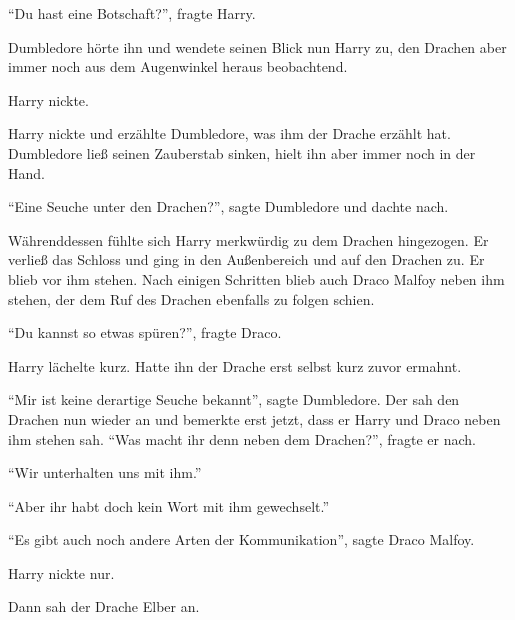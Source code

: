 \enquote{Du hast eine Botschaft?}, fragte Harry.

Dumbledore hörte ihn und wendete seinen Blick nun Harry zu, den Drachen aber immer noch aus dem Augenwinkel heraus beobachtend.

 Harry nickte. 

Harry nickte und erzählte Dumbledore, was ihm der Drache erzählt hat. Dumbledore ließ seinen Zauberstab sinken, hielt ihn aber immer noch in der Hand.

\enquote{Eine Seuche unter den Drachen?}, sagte Dumbledore und dachte nach.

Währenddessen fühlte sich Harry merkwürdig zu dem Drachen hingezogen. Er verließ das Schloss und ging in den Außenbereich und auf den Drachen zu. Er blieb vor ihm stehen. Nach einigen Schritten blieb auch Draco Malfoy neben ihm stehen, der dem Ruf des Drachen ebenfalls zu folgen schien.


\enquote{Du kannst so etwas spüren?}, fragte Draco.


Harry lächelte kurz. Hatte ihn der Drache erst selbst kurz zuvor ermahnt.

\enquote{Mir ist keine derartige Seuche bekannt}, sagte Dumbledore. Der sah den Drachen nun wieder an und bemerkte erst jetzt, dass er Harry und Draco neben ihm stehen sah. \enquote{Was macht ihr denn neben dem Drachen?}, fragte er nach.

\enquote{Wir unterhalten uns mit ihm.}

\enquote{Aber ihr habt doch kein Wort mit ihm gewechselt.}

\enquote{Es gibt auch noch andere Arten der Kommunikation}, sagte Draco Malfoy.

Harry nickte nur.

Dann sah der Drache Elber an. 

